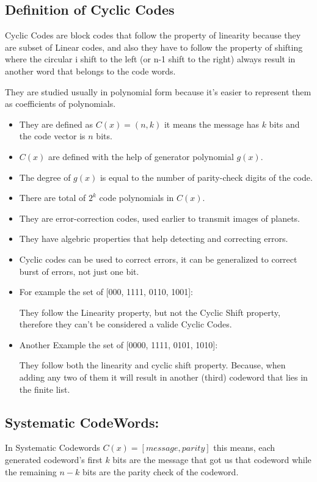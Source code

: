 \documentclass[a4paper,12pt]{report}
\begin{document}
    \subsection{Definition of Cyclic Codes}
    Cyclic Codes are block codes that follow the property of linearity because they are subset of Linear codes,
    and also they have to follow the property of shifting where the circular i shift to the left (or n-1 shift to the right) always
    result in another word that belongs to the code words.
    
    They are studied usually in polynomial form because it's easier to represent them as coefficients of
        polynomials.
    {\renewcommand\labelitemi{}
    \begin{itemize}
        \item They are defined as $C(x) = (n, k)$ it means the message has $k$ bits
                and the code vector is $n$ bits.
        \item $C(x)$ are defined with the help of generator polynomial $g(x)$.
        \item The degree of $g(x)$ is equal to the number of parity-check digits of the code.
        \item There are total of $2^k$ code polynomials in $C(x)$.
        \item They are error-correction codes, used earlier to transmit images of planets.
        \item They have algebric properties that help detecting and correcting errors.
        \item Cyclic codes can be used to correct errors, it can be generalized to correct
        burst of errors, not just one bit.
        \item For example the set of [000, 1111, 0110, 1001]:
                
                They follow the Linearity property, but not the Cyclic Shift property,
                therefore they can't be considered a valide Cyclic Codes.
        \item Another Example the set of [0000, 1111, 0101, 1010]:
                
                They follow both the linearity and cyclic shift property.
                Because, when adding any two of them it will result in another (third) codeword
                that lies in the finite list.
    \end{itemize}
    

    \subsection{Systematic CodeWords:}
        In Systematic Codewords $C(x) = \left[ message, parity\right]$ this means, each
        generated codeword's first $k$ bits are the message that got us that codeword
        while the remaining $n-k$ bits are the parity check of the codeword.

}
\end{document}
